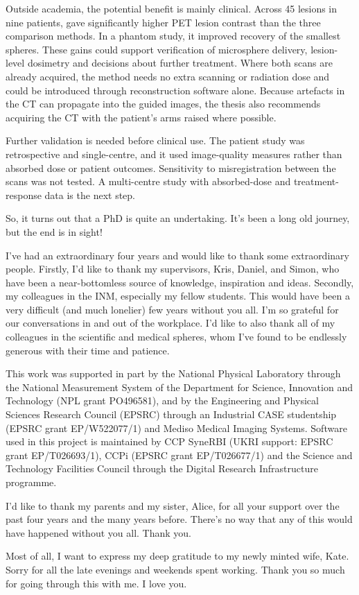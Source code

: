 \begin{impactstatement}
Outside academia, the potential benefit is mainly clinical. Across 45 lesions in nine patients, \wdtnv{} gave significantly higher PET lesion contrast than the three comparison methods. In a phantom study, it improved recovery of the smallest spheres. These gains could support verification of microsphere delivery, lesion-level dosimetry and decisions about further treatment. Where both scans are already acquired, the method needs no extra scanning or radiation dose and could be introduced through reconstruction software alone. Because artefacts in the CT can propagate into the guided images, the thesis also recommends acquiring the CT with the patient's arms raised where possible.

Further validation is needed before clinical use. The patient study was retrospective and single-centre, and it used image-quality measures rather than absorbed dose or patient outcomes. Sensitivity to misregistration between the scans was not tested. A multi-centre study with absorbed-dose and treatment-response data is the next step.
\end{impactstatement}

\begin{acknowledgements}
So, it turns out that a PhD is quite an undertaking. It's been a long old journey, but the end is in sight!

I've had an extraordinary four years and would like to thank some extraordinary people. Firstly, I'd like to thank my supervisors, Kris, Daniel, and Simon, who have been a near-bottomless source of knowledge, inspiration and ideas. Secondly, my colleagues in the INM, especially my fellow students. This would have been a very difficult (and much lonelier) few years without you all. I'm so grateful for our conversations in and out of the workplace. I'd like to also thank all of my colleagues in the scientific and medical spheres, whom I've found to be endlessly generous with their time and patience.

This work was supported in part by the National Physical Laboratory through the National Measurement System of the Department for Science, Innovation and Technology (NPL grant PO496581), and by the Engineering and Physical Sciences Research Council (EPSRC) through an Industrial CASE studentship (EPSRC grant EP/W522077/1) and Mediso Medical Imaging Systems. Software used in this project is maintained by CCP SyneRBI (UKRI support: EPSRC grant EP/T026693/1), CCPi (EPSRC grant EP/T026677/1) and the Science and Technology Facilities Council through the Digital Research Infrastructure programme.

I'd like to thank my parents and my sister, Alice, for all your support over the past four years and the many years before. There's no way that any of this would have happened without you all. Thank you.

Most of all, I want to express my deep gratitude to my newly minted wife, Kate. Sorry for all the late evenings and weekends spent working. Thank you so much for going through this with me. I love you.
\end{acknowledgements}


